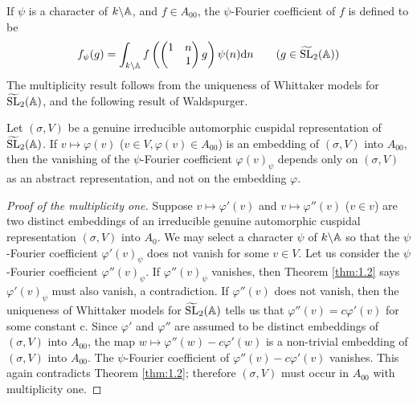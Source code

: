 If $\psi$ is a character of $k \backslash \mathbb{A}$, and $f \in A_{00}$, the $\psi$-Fourier coefficient of $f$ is defined to be
\[
f_\psi(g) = \int_{k \backslash \mathbb{A}} f\left(\begin{pmatrix} 1 & n \\ & 1\end{pmatrix}g\right) \psi(n) \mathrm{d} n \qquad (g \in \widetilde{\mathrm{SL}}_2(\mathbb{A}))
\]
The multiplicity result follows from the uniqueness of Whittaker models for $\widetilde{\mathrm{SL}}_2(\mathbb{A})$, and the following result of Waldspurger.

\begin{theorem}
\label{thm:1.2}
Let $(\sigma, V)$ be a genuine irreducible automorphic cuspidal representation of $\widetilde{\mathrm{SL}}_2(\mathbb{A})$.
If $v \mapsto \varphi(v)$ ($v \in V, \varphi(v) \in A_{00}$)
is an embedding of $(\sigma, V)$ into $A_{00}$, then the vanishing of the $\psi$-Fourier coefficient $\varphi(v)_\psi$ depends only on $(\sigma, V)$ as an abstract representation, and not on the embedding $\varphi$.
\end{theorem}


\begin{proof}[Proof of the multiplicity one]
Suppose $v \mapsto \varphi'(v)$ and $v \mapsto \varphi''(v)$
($v \in v$) are two distinct embeddings of an irreducible genuine automorphic cuspidal representation $(\sigma, V)$ into $A_0$.
We may select a character $\psi$ of $k \backslash \mathbb{A}$ so that the $\psi$-Fourier coefficient $\varphi'(v)_\psi$ does
not vanish for some $v \in V$.
Let us consider the $\psi$-Fourier coefficient
$\varphi''(v)_\psi$.
If $\varphi''(v)_\psi$ vanishes, then Theorem \ref{thm:1.2} says $\varphi'(v)_\psi$ must also vanish, a contradiction.
If $\varphi''(v)$ does not vanish, then the uniqueness of Whittaker models for $\widetilde{\mathrm{SL}}_2(\mathbb{A})$ tells us that $\varphi''(v) = c\varphi'(v)$ for some constant c.
Since $\varphi'$ and $\varphi''$ are assumed to be distinct
embeddings of $(\sigma, V)$ into $A_{00}$, the map $w \mapsto \varphi''(w) - c\varphi'(w)$ is a non-trivial embedding of 
 $(\sigma, V)$ into $A_{00}$.
The $\psi$-Fourier coefficient of $\varphi''(v) - c\varphi'(v)$ vanishes.
This again contradicts Theorem \ref{thm:1.2}; therefore $(\sigma, V)$ must occur in $A_{00}$ with multiplicity one.
\end{proof}

